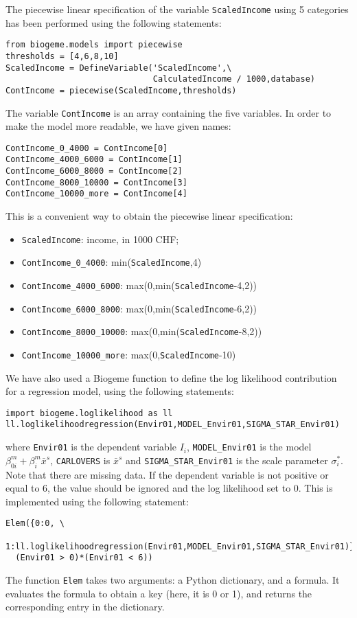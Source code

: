 \documentclass[12pt,a4paper]{article}
\begin{document}
The piecewise linear  specification of the variable
\lstinline+ScaledIncome+ using 5 categories has been performed using the following
statements:
\begin{lstlisting}
from biogeme.models import piecewise
thresholds = [4,6,8,10]
ScaledIncome = DefineVariable('ScaledIncome',\
                              CalculatedIncome / 1000,database)
ContIncome = piecewise(ScaledIncome,thresholds)
\end{lstlisting}
The variable \lstinline+ContIncome+ is an array containing the five
variables. In order to make the model more readable, we have given
 names: 
\begin{lstlisting}
ContIncome_0_4000 = ContIncome[0]
ContIncome_4000_6000 = ContIncome[1]
ContIncome_6000_8000 = ContIncome[2]
ContIncome_8000_10000 = ContIncome[3]
ContIncome_10000_more = ContIncome[4]
\end{lstlisting}
This is a convenient way to obtain the piecewise linear specification:
\begin{itemize}
\item \lstinline+ScaledIncome+: income, in 1000 CHF;
\item \lstinline+ContIncome_0_4000+:  min(\lstinline+ScaledIncome+,4)
\item \lstinline+ContIncome_4000_6000+: max(0,min(\lstinline+ScaledIncome+-4,2))
\item \lstinline+ContIncome_6000_8000+: max(0,min(\lstinline+ScaledIncome+-6,2))
\item \lstinline+ContIncome_8000_10000+: max(0,min(\lstinline+ScaledIncome+-8,2))
\item \lstinline+ContIncome_10000_more+: max(0,\lstinline+ScaledIncome+-10)
\end{itemize}



We have also used a Biogeme function to define the log likelihood
contribution for a regression model, using the following statements:
\begin{lstlisting}
import biogeme.loglikelihood as ll
ll.loglikelihoodregression(Envir01,MODEL_Envir01,SIGMA_STAR_Envir01)
\end{lstlisting}
  where
\lstinline$Envir01$ is the dependent variable $I_i$,
\lstinline$MODEL_Envir01$ is the model $\beta_{0i}^m +\beta^m_i
\bar{x}^s$, \lstinline$CARLOVERS$ is $\bar{x}^s$ and
\lstinline$SIGMA_STAR_Envir01$ is the scale parameter $\sigma_i^*$. Note that there are
missing data. If the dependent variable is not positive or equal to 6, the value
should be ignored and the log
likelihood set to 0. This is implemented using the following
statement: 
\begin{lstlisting}
Elem({0:0, \
 1:ll.loglikelihoodregression(Envir01,MODEL_Envir01,SIGMA_STAR_Envir01)},\
  (Envir01 > 0)*(Envir01 < 6)) 
\end{lstlisting}
The function \lstinline+Elem+ takes two arguments: a Python
dictionary, and a formula. It evaluates the formula to obtain a key
(here, it is 0 or 1), and returns the corresponding entry in the
dictionary.
\end{document}

